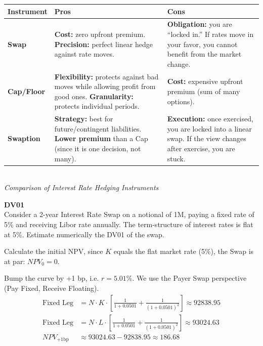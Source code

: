 \documentclass[12pt,a4paper]{exam}
\begin{document}
\begin{questions}
\begin{solution}
	\begin{center}
		\renewcommand{\arraystretch}{1.4}
		\small %
		\begin{tabular}{|l|p{4.5cm}|p{4.5cm}|}
			\hline
			\textbf{Instrument} & \textbf{Pros} & \textbf{Cons} \\ \hline
			\textbf{Swap} &
			\textbf{Cost:} zero upfront premium. \newline
			\textbf{Precision:} perfect linear hedge against rate moves. &
			\textbf{Obligation:} you are ``locked in.'' If rates move in your favor, you cannot benefit from the market change. \\ \hline
			\textbf{Cap/Floor} &
			\textbf{Flexibility:} protects against bad moves while allowing profit from good ones. \newline
			\textbf{Granularity:} protects individual periods. &
			\textbf{Cost:} expensive upfront premium (sum of many options). \\ \hline
			\textbf{Swaption} &
			\textbf{Strategy:} best for future/contingent liabilities. \newline
			\textbf{Lower premium} than a Cap (since it is one decision, not many). &
			\textbf{Execution:} once exercised, you are locked into a linear swap. If the view changes after exercise, you are stuck. \\ \hline
		\end{tabular}
		\\[10pt] %
		\textit{Comparison of Interest Rate Hedging Instruments}
	\end{center}
\end{solution}

\question \textbf{DV01} \\
Consider a 2-year Interest Rate Swap on a notional of 1M, paying a fixed rate of 5\% and receiving Libor rate annually. The term-structure of interest rates is flat at 5\%. Estimate numerically the DV01 of the swap.

\begin{solution}
	Calculate the initial NPV, since $K$ equals the flat market rate (5\%), the Swap is at par: $NPV_0=0$.

	Bump the curve by +1 bp, i.e. $r=5.01\%$. We use the Payer Swap perspective (Pay Fixed, Receive Floating).
	\begin{align*}
		\text{Fixed Leg} &= N\cdot K\cdot \left[\frac{1}{1+0.0501}+\frac{1}{(1+0.0501)^2}\right] \approx 92838.95 \\
		\text{Fixed Leg} &= N\cdot L\cdot \left[\frac{1}{1+0.0501}+\frac{1}{(1+0.0501)^2}\right] \approx 93024.63 \\
		NPV_{+1 \text{bp}} &\approx 93024.63-92838.95\approx 186.68
	\end{align*}


\end{solution}
\end{questions}
\end{document}
